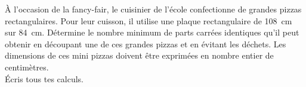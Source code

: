 %
%
À l'occasion de la fancy-fair, le cuisinier de l'école confectionne de grandes pizzas rectangulaires. Pour leur cuisson, il utilise une plaque rectangulaire de \SI{108}{cm} sur \SI{84}{cm}. Détermine le nombre minimum de parts carrées identiques qu'il peut obtenir en découpant une de ces grandes pizzas et en évitant les déchets. Les dimensions de ces mini pizzas doivent être exprimées en nombre entier de centimètres. \\
    Écris tous tes calculs.
